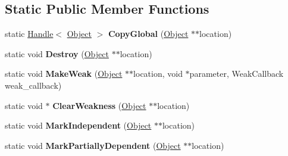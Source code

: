 \subsection*{Static Public Member Functions}
\begin{DoxyCompactItemize}
\item 
\hypertarget{classv8_1_1internal_1_1_global_handles_ac597513b32ed032832df59433dafbf16}{}static \hyperlink{classv8_1_1internal_1_1_handle}{Handle}$<$ \hyperlink{classv8_1_1internal_1_1_object}{Object} $>$ {\bfseries Copy\+Global} (\hyperlink{classv8_1_1internal_1_1_object}{Object} $\ast$$\ast$location)\label{classv8_1_1internal_1_1_global_handles_ac597513b32ed032832df59433dafbf16}

\item 
\hypertarget{classv8_1_1internal_1_1_global_handles_adfc22e35952c6df07ae8c8e1d1ac499a}{}static void {\bfseries Destroy} (\hyperlink{classv8_1_1internal_1_1_object}{Object} $\ast$$\ast$location)\label{classv8_1_1internal_1_1_global_handles_adfc22e35952c6df07ae8c8e1d1ac499a}

\item 
\hypertarget{classv8_1_1internal_1_1_global_handles_a21d3bdc56a5b213b53e9d12ecf2ca712}{}static void {\bfseries Make\+Weak} (\hyperlink{classv8_1_1internal_1_1_object}{Object} $\ast$$\ast$location, void $\ast$parameter, Weak\+Callback weak\+\_\+callback)\label{classv8_1_1internal_1_1_global_handles_a21d3bdc56a5b213b53e9d12ecf2ca712}

\item 
\hypertarget{classv8_1_1internal_1_1_global_handles_a2e009c5a6d7d5fff5d176961107571a9}{}static void $\ast$ {\bfseries Clear\+Weakness} (\hyperlink{classv8_1_1internal_1_1_object}{Object} $\ast$$\ast$location)\label{classv8_1_1internal_1_1_global_handles_a2e009c5a6d7d5fff5d176961107571a9}

\item 
\hypertarget{classv8_1_1internal_1_1_global_handles_a4096f08b9b8f947efcbb23310750f519}{}static void {\bfseries Mark\+Independent} (\hyperlink{classv8_1_1internal_1_1_object}{Object} $\ast$$\ast$location)\label{classv8_1_1internal_1_1_global_handles_a4096f08b9b8f947efcbb23310750f519}

\item 
\hypertarget{classv8_1_1internal_1_1_global_handles_a70677ac9e8d1b9cb61a80af4efd90655}{}static void {\bfseries Mark\+Partially\+Dependent} (\hyperlink{classv8_1_1internal_1_1_object}{Object} $\ast$$\ast$location)\label{classv8_1_1internal_1_1_global_handles_a70677ac9e8d1b9cb61a80af4efd90655}


\end{DoxyCompactItemize}
